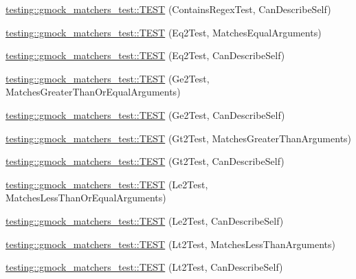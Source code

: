 \begin{DoxyCompactItemize}
\item 
\hyperlink{namespacetesting_1_1gmock__matchers__test_ac3d469a146dec0c6ede2b46ff992c8d7}{testing\+::gmock\+\_\+matchers\+\_\+test\+::\+T\+E\+ST} (Contains\+Regex\+Test, Can\+Describe\+Self)
\item 
\hyperlink{namespacetesting_1_1gmock__matchers__test_a768adf8450910e4c3ac0cb2caec8a4c2}{testing\+::gmock\+\_\+matchers\+\_\+test\+::\+T\+E\+ST} (Eq2\+Test, Matches\+Equal\+Arguments)
\item 
\hyperlink{namespacetesting_1_1gmock__matchers__test_a45da3962b4ae052dd47e1ae1bfd8b762}{testing\+::gmock\+\_\+matchers\+\_\+test\+::\+T\+E\+ST} (Eq2\+Test, Can\+Describe\+Self)
\item 
\hyperlink{namespacetesting_1_1gmock__matchers__test_a100bae52c11f2e44a141652002d3bee2}{testing\+::gmock\+\_\+matchers\+\_\+test\+::\+T\+E\+ST} (Ge2\+Test, Matches\+Greater\+Than\+Or\+Equal\+Arguments)
\item 
\hyperlink{namespacetesting_1_1gmock__matchers__test_aaee5baf487e6234d1d8b6779b70a15c0}{testing\+::gmock\+\_\+matchers\+\_\+test\+::\+T\+E\+ST} (Ge2\+Test, Can\+Describe\+Self)
\item 
\hyperlink{namespacetesting_1_1gmock__matchers__test_a4ef0cb0e88b7801075798649189d7b72}{testing\+::gmock\+\_\+matchers\+\_\+test\+::\+T\+E\+ST} (Gt2\+Test, Matches\+Greater\+Than\+Arguments)
\item 
\hyperlink{namespacetesting_1_1gmock__matchers__test_ae7351eb01d03897324b2fe03045f2c10}{testing\+::gmock\+\_\+matchers\+\_\+test\+::\+T\+E\+ST} (Gt2\+Test, Can\+Describe\+Self)
\item 
\hyperlink{namespacetesting_1_1gmock__matchers__test_add304ba60989990fc78a616c9592a948}{testing\+::gmock\+\_\+matchers\+\_\+test\+::\+T\+E\+ST} (Le2\+Test, Matches\+Less\+Than\+Or\+Equal\+Arguments)
\item 
\hyperlink{namespacetesting_1_1gmock__matchers__test_a75d0bbfa66d404aa458f0739297c9edc}{testing\+::gmock\+\_\+matchers\+\_\+test\+::\+T\+E\+ST} (Le2\+Test, Can\+Describe\+Self)
\item 
\hyperlink{namespacetesting_1_1gmock__matchers__test_ac7ecdd71d0cc49438f7ad1863fdfab05}{testing\+::gmock\+\_\+matchers\+\_\+test\+::\+T\+E\+ST} (Lt2\+Test, Matches\+Less\+Than\+Arguments)
\item 
\hyperlink{namespacetesting_1_1gmock__matchers__test_a9f557c4688b2907704650cc18cfd9dcf}{testing\+::gmock\+\_\+matchers\+\_\+test\+::\+T\+E\+ST} (Lt2\+Test, Can\+Describe\+Self)
\item 

\end{DoxyCompactItemize}
